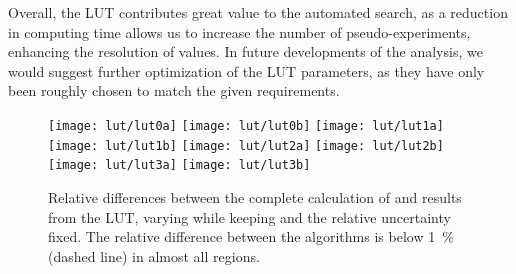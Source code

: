 Overall, the \ac{LUT} contributes great value to the automated search, as a reduction in computing time allows us to increase the number of pseudo-experiments, enhancing the resolution of \ptilde values. In future developments of the analysis, we would suggest further optimization of the \ac{LUT} parameters, as they have only been roughly chosen to match the given requirements.

\begin{figure}
    \centering
    \texttt{[image: lut/lut0a]}
    \texttt{[image: lut/lut0b]}
    \texttt{[image: lut/lut1a]}
    \texttt{[image: lut/lut1b]}
    \texttt{[image: lut/lut2a]}
    \texttt{[image: lut/lut2b]}
    \texttt{[image: lut/lut3a]}  
    \texttt{[image: lut/lut3b]}
    \caption{Relative differences between the complete calculation of \TS and results from the \ac{LUT}, varying \Nmc while keeping \Ndata and the relative uncertainty fixed. The relative difference between the algorithms is below \SI{1}{\percent} (dashed line) in almost all regions.}
    \label{fig:lut_reldiff_mc}
\end{figure}